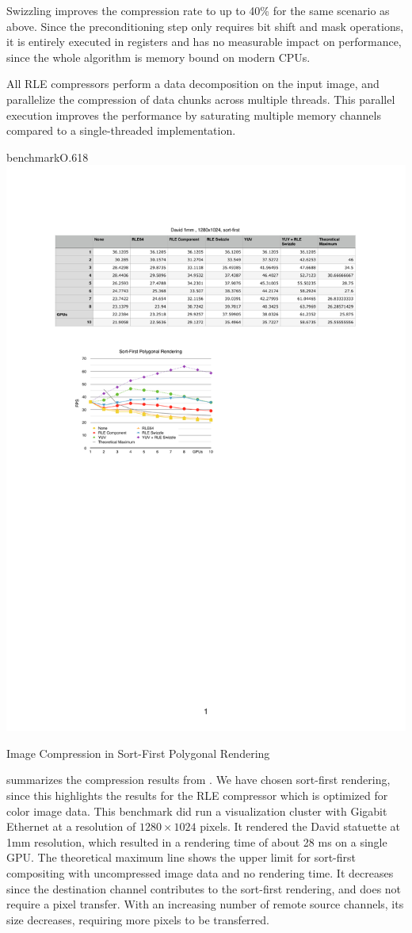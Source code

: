 Swizzling improves the compression rate to up to 40\% for the same scenario as
above. Since the preconditioning step only requires bit shift and mask
operations, it is entirely executed in registers and has no measurable
impact on performance, since the whole algorithm is memory bound on modern CPUs.

All RLE compressors perform a data decomposition on the input image, and
parallelize the compression of data chunks across multiple threads. This
parallel execution improves the performance by saturating multiple memory
channels compared to a single-threaded implementation.

\begin{wrapfloat}{benchmark}{O}{.618\textwidth}
  \includegraphics[width=.618\textwidth]{results/rle}
  \caption{Image Compression in Sort-First Polygonal Rendering}
  \label{rRLE}
\end{wrapfloat}

 summarizes the compression results from \cite{MEP:10}. We have
chosen sort-first rendering, since this highlights the results for the RLE
compressor which is optimized for color image data. This benchmark did run a
visualization cluster with Gigabit Ethernet at a resolution of $1280\times
1024$ pixels. It rendered the David statuette at 1mm resolution, which resulted
in a rendering time of about 28 ms on a single GPU. The theoretical maximum
line shows the upper limit for sort-first compositing with uncompressed image
data and no rendering time. It decreases since the destination channel
contributes to the sort-first rendering, and does not require a pixel transfer.
With an increasing number of remote source channels, its size decreases,
requiring more pixels to be transferred.

